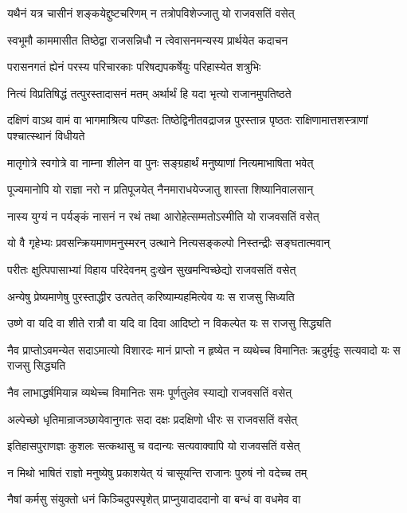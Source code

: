 \twolineshloka
{यथैनं यत्र चासीनं शङ्कयेद्दुष्टचरिणम्}
{न तत्रोपविशेज्जातु यो राजवसतिं वसेत्}


\twolineshloka
{स्वभूमौ काममासीत तिष्ठेद्वा राजसन्निधौ}
{न त्वेवासनमन्यस्य प्रार्थयेत कदाचन}


\twolineshloka
{परासनगतं ह्येनं परस्य परिचारकाः}
{परिषद्यपकर्षेयुः परिहास्येत शत्रुभिः}


\twolineshloka
{नित्यं विप्रतिषिद्धं तत्पुरस्तादासनं मतम्}
{अर्थार्थं हि यदा भृत्यो राजानमुपतिष्ठते}


\threelineshloka
{दक्षिणं वाऽथ वामं वा भागमाश्रित्य पण्डितः}
{तिष्ठेद्विनीतवद्राजन्न पुरस्तान्न पृष्ठतः}
{राक्षिणामात्तशस्त्राणां पश्चात्स्थानं विधीयते}


\twolineshloka
{मातृगोत्रे स्वगोत्रे वा नाम्ना शीलेन वा पुनः}
{सङ्ग्रहार्थं मनुष्याणां नित्यमाभाषिता भवेत्}


\twolineshloka
{पूज्यमानोपि यो राज्ञा नरो न प्रतिपूजयेत्}
{नैनमाराधयेज्जातु शास्ता शिष्यानिवालसान्}


\twolineshloka
{नास्य युग्यं न पर्यङ्कं नासनं न रथं तथा}
{आरोहेत्सम्मतोऽस्मीति यो राजवसतिं वसेत्}


\twolineshloka
{यो वै गृहेभ्यः प्रवसन्क्रियमाणमनुस्मरन्}
{उत्थाने नित्यसङ्कल्पो निस्तन्द्रीः सङ्घतात्मवान्}


\twolineshloka
{परीतः क्षुत्पिपासाभ्यां विहाय परिदेवनम्}
{दुःखेन सुखमन्विच्छेद्यो राजवसतिं वसेत्}


\twolineshloka
{अन्येषु प्रेष्यमाणेषु पुरस्ताद्धीर उत्पतेत्}
{करिष्याम्यहमित्येव यः स राजसु सिध्यति}


\twolineshloka
{उष्णे वा यदि वा शीते रात्रौ वा यदि वा दिवा}
{आदिष्टो न विकल्पेत यः स राजसु सिद्ध्यति}


\threelineshloka
{नैव प्राप्तोऽवमन्येत सदाऽमात्यो विशारदः}
{मानं प्राप्तो न हृष्येत न व्यथेच्च विमानितः}
{ऋदुर्मृदुः सत्यवादो यः स राजसु सिद्ध्यति}


\twolineshloka
{नैव लाभाद्धर्षमियान्न व्यथेच्च विमानितः}
{समः पूर्णतुलेव स्याद्यो राजवसतिं वसेत्}


\twolineshloka
{अल्पेच्छो धृतिमान्राजञ्छायेवानुगतः सदा}
{दक्षः प्रदक्षिणो धीरः स राजवसतिं वसेत्}


\twolineshloka
{इतिहासपुराणज्ञः कुशलः सत्कथासु च}
{वदान्यः सत्यवाक्वापि यो राजवसतिं वसेत्}


\twolineshloka
{न मिथो भाषितं राज्ञो मनुष्येषु प्रकाशयेत्}
{यं चासूयन्ति राजानः पुरुषं नो वदेच्च तम्}


\twolineshloka
{नैषां कर्मसु संयुक्तो धनं किञ्चिदुपस्पृशेत्}
{प्राप्नुयादाददानो वा बन्धं वा वधमेव वा}


